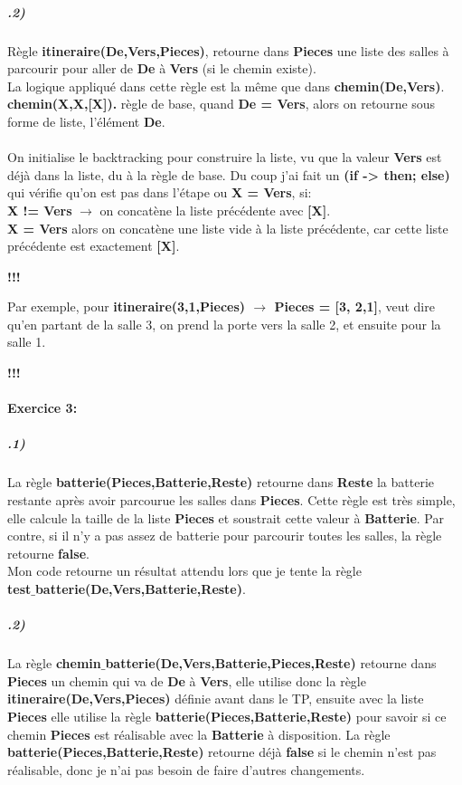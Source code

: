 \documentclass[12pt]
{report}
\newcommand\tab[1][1cm]{\hspace*{#1}}
\begin{document}
\subparagraph*{\textbf{.2)}} Règle \textbf{itineraire(De,Vers,Pieces)}, retourne dans \textbf{Pieces}  une liste des salles à parcourir pour aller de \textbf{De} à \textbf{Vers} (si le chemin existe).
\\ \tab La logique appliqué dans cette règle est la même que dans \textbf{chemin(De,Vers)}. 
\\ \tab \textbf{chemin(X,X,[X]).} règle de base, quand \textbf{De = Vers}, alors on retourne sous forme de liste, l'élément \textbf{De}.
\\
\\ \tab On initialise le backtracking pour construire la liste, vu que la valeur \textbf{Vers} est déjà dans la liste, du à la règle de base. Du coup j'ai fait un \textbf{(if -> then; else)} qui vérifie qu'on est pas dans l'étape ou \textbf{X = Vers}, si: \\ \tab \textbf{X != Vers} $\rightarrow$ on concatène la liste précédente avec \textbf{[X]}. \\ \tab \textbf{X = Vers} alors on concatène une liste vide à la liste précédente, car cette liste précédente est exactement \textbf{[X]}.
\\ 
\begin{center}
\textbf{{\large !!!}}
\end{center}
\tab Par exemple, pour \textbf{itineraire(3,1,Pieces) $\rightarrow$ Pieces = [3, 2,1]}, veut dire qu'en partant de la salle 3, on prend la porte vers la salle 2, et ensuite pour la salle 1.
\begin{center}
\textbf{{\large !!!}}
\end{center}

\paragraph*{\textbf{Exercice 3:}}
\subparagraph*{\textbf{.1)}} La règle \textbf{batterie(Pieces,Batterie,Reste)} retourne dans \textbf{Reste} la batterie restante après avoir parcourue les salles dans \textbf{Pieces}. Cette règle est très simple, elle calcule la taille de la liste \textbf{Pieces} et soustrait cette valeur à \textbf{Batterie}. Par contre, si il n'y a pas assez de batterie pour parcourir toutes les salles, la règle retourne \textbf{false}.
\\ \tab Mon code retourne un résultat attendu lors que je tente la règle \\ \textbf{test$\_$batterie(De,Vers,Batterie,Reste)}.


\subparagraph*{\textbf{.2)}} La règle \textbf{chemin$\_$batterie(De,Vers,Batterie,Pieces,Reste)} retourne dans \textbf{Pieces} un chemin qui va de \textbf{De} à \textbf{Vers}, elle utilise donc la règle \textbf{itineraire(De,Vers,Pieces)} définie avant dans le TP, ensuite avec la liste \textbf{Pieces} elle utilise la règle \textbf{batterie(Pieces,Batterie,Reste)} pour savoir si ce chemin \textbf{Pieces} est réalisable avec la \textbf{Batterie} à disposition. La règle \textbf{batterie(Pieces,Batterie,Reste)} retourne déjà \textbf{false} si le chemin n'est pas réalisable, donc je n'ai pas besoin de faire d'autres changements.
\end{document}
